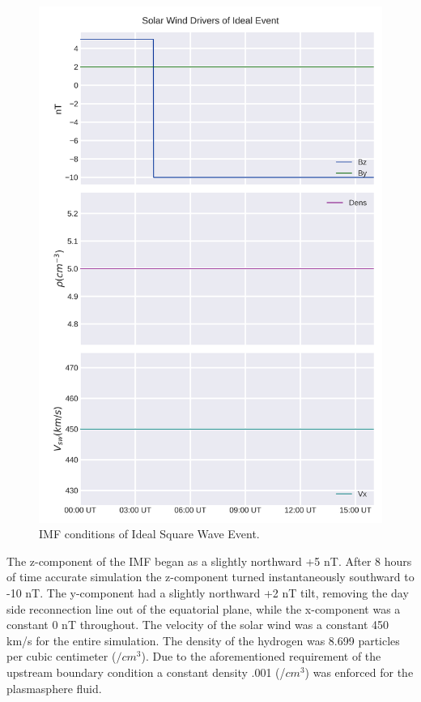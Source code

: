 \documentclass[utf8]{report}
\begin{document}
\begin{figure}[!ht]
\begin{center}
\includegraphics{Ideal_Square_Wave.png}
\caption{IMF conditions of Ideal Square Wave Event.}
\label{fig:1}
\end{center}
\end{figure}

The z-component of the IMF began as a slightly northward +5 nT. After 8 hours of time accurate simulation the z-component turned instantaneously southward to -10 nT. The y-component had a slightly northward +2 nT tilt, removing the day side reconnection line out of the equatorial plane, while the x-component was a constant 0 nT throughout. The velocity of the solar wind was a constant 450 km/s for the entire simulation. The density of the hydrogen was 8.699 particles per cubic centimeter ($/{cm^{3}}$). Due to the aforementioned requirement of the upstream boundary condition a constant density .001 (/$cm^{3}$) was enforced for the plasmasphere fluid. 
\end{document}
